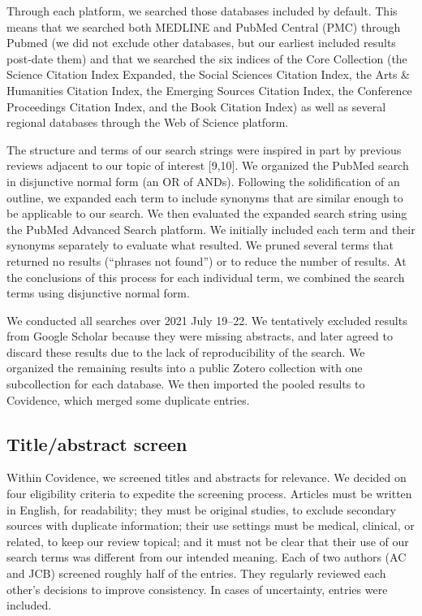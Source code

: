 \documentclass[preprint, 3p,
authoryear]{elsarticle} %
\begin{document}
Through each platform, we searched those databases included by default.
This means that we searched both MEDLINE and PubMed Central (PMC)
through Pubmed (we did not exclude other databases, but our earliest
included results post-date them) and that we searched the six indices of
the Core Collection (the Science Citation Index Expanded, the Social
Sciences Citation Index, the Arts \& Humanities Citation Index, the
Emerging Sources Citation Index, the Conference Proceedings Citation
Index, and the Book Citation Index) as well as several regional
databases through the Web of Science platform.

The structure and terms of our search strings were inspired in part by
previous reviews adjacent to our topic of interest {[}9,10{]}. We
organized the PubMed search in disjunctive normal form (an OR of ANDs).
Following the solidification of an outline, we expanded each term to
include synonyms that are similar enough to be applicable to our search.
We then evaluated the expanded search string using the PubMed Advanced
Search platform. We initially included each term and their synonyms
separately to evaluate what resulted. We pruned several terms that
returned no results (``phrases not found'') or to reduce the number of
results. At the conclusions of this process for each individual term, we
combined the search terms using disjunctive normal form.

We conducted all searches over 2021 July 19--22. We tentatively excluded
results from Google Scholar because they were missing abstracts, and
later agreed to discard these results due to the lack of reproducibility
of the search. We organized the remaining results into a public Zotero
collection with one subcollection for each database. We then imported
the pooled results to Covidence, which merged some duplicate entries.

\hypertarget{titleabstract-screen}{%
\subsection{Title/abstract screen}\label{titleabstract-screen}}

Within Covidence, we screened titles and abstracts for relevance. We
decided on four eligibility criteria to expedite the screening process.
Articles must be written in English, for readability; they must be
original studies, to exclude secondary sources with duplicate
information; their use settings must be medical, clinical, or related,
to keep our review topical; and it must not be clear that their use of
our search terms was different from our intended meaning. Each of two
authors (AC and JCB) screened roughly half of the entries. They
regularly reviewed each other's decisions to improve consistency. In
cases of uncertainty, entries were included.
\end{document}
